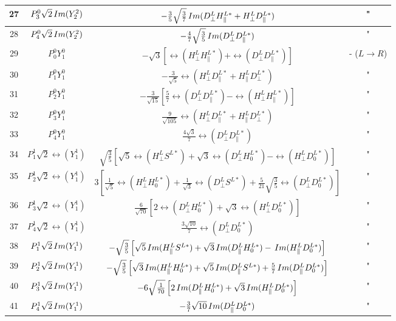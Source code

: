 \begin{tabular}{c|c|c|c}
 27  &   $P^0_3 \sqrt{2}\, Im(Y^2_2)$ &  $-\frac{3}{5} \sqrt{ \frac{3}{7}}  \, Im(D^L_\perp H^{L\ast}_\parallel + H^L_\perp D^{L\ast}_\parallel)  $  & " \\ \hline
 28  &   $P^0_4 \sqrt{2}\, Im(Y^2_2)$ &  $-\frac{4}{7} \sqrt{\frac{3}{5}}  \, Im(D^L_\perp D^{L\ast}_\parallel) $   & " \\ \hline \hline
 29  &   $P^0_0 Y^0_1$     &  $-\sqrt{3}\left[ \rel(H^L_\perp H^{L\ast}_\parallel) + \rel(D^L_\perp D^{L\ast}_\parallel) \right]$  & - ($L \to R$) \\ \hline
 30  &   $P^0_1 Y^0_1$     &  $-\frac{3}{\sqrt{5}} \rel( H^L_\perp D^{L\ast}_\parallel + H^L_\parallel D^{L\ast}_\perp ) $ & " \\ \hline
 31  &   $P^0_2 Y^0_1$     &  $-\frac{3}{\sqrt{15}} \left[ \frac{5}{7} \rel(D^L_\perp D^{L\ast}_\parallel) - \rel(H^L_\perp H^{L\ast}_\parallel)  \right]$ & " \\ \hline
 32  &   $P^0_3 Y^0_1$     &  $\frac{9}{\sqrt{105}}  \rel(H^L_\perp D^{L\ast}_\parallel  + H^L_\parallel D^{L\ast}_\perp ) $ & " \\ \hline
 33  &   $P^0_4 Y^0_1$     &  $\frac{4\sqrt{3}}{7} \rel(D^L_\perp D^{L\ast}_\parallel)$  & " \\ \hline
 34  &   $P^1_1 \sqrt{2}\rel(Y^1_1)$   & $\sqrt{\frac{3}{5}} \left[ \sqrt{5} \rel(H^L_\perp S^{L \ast})  + \sqrt{3} \rel(D^L_\perp H^{L\ast}_0)  - \rel(H^L_\perp D^{L \ast}_0) \right]$  & " \\ \hline
 35  &   $P^1_2 \sqrt{2}\rel(Y^1_1)$   & $ 3 \left[ \frac{1}{\sqrt{5}} \rel(H^L_\perp H^{L \ast}_0)  + \frac{1}{\sqrt{3}} \rel(D^L_\perp S^{L\ast})  + \frac{5}{21} \sqrt{\frac{3}{5}} \rel(D^L_\perp D^{L \ast}_0 ) \right] $  & " \\ \hline
 36  &   $P^1_3 \sqrt{2}\rel(Y^1_1)$   & $ \frac{6}{\sqrt{70}} \left[ 2 \rel(D^L_\perp H^{L \ast}_0)  + \sqrt{3} \rel(H^L_\perp D^{L\ast}_0) \right]$  & " \\ \hline
 37  &   $P^1_4 \sqrt{2}\rel(Y^1_1)$   & $\frac{3 \sqrt{10}}{7} \rel(D^L_\perp D^{L \ast}_0 ) $  & " \\ \hline
 38  &   $P^1_1 \sqrt{2}\, Im(Y^1_1)$   & $-\sqrt{\frac{3}{5}} \left[ \sqrt{5} \, Im ( H^L_\parallel S^{L\ast}) + \sqrt{3} \, Im(D^L_\parallel H^{L \ast}_0) - \, Im(H^L_\parallel D^{L \ast}_0)  \right]  $  & " \\ \hline
 39  &   $P^1_2 \sqrt{2}\, Im(Y^1_1)$   & $ -\sqrt{\frac{3}{5}} \left[ \sqrt{3} \, Im(H^L_\parallel H^{L \ast}_0)  + \sqrt{5} \, Im(D^L_\parallel S^{L\ast})  + \frac{5}{7} \, Im(D^L_\parallel D^{L \ast}_0 )\right] $  & " \\ \hline
 40  &   $P^1_3 \sqrt{2}\, Im(Y^1_1)$   & $ -6\sqrt{\frac{1}{70}}\left[ 2\, Im(D^L_\parallel H^{L \ast}_0)  + \sqrt{3} \, Im(H^L_\parallel D^{L\ast}_0)\right]$   & " \\ \hline
 41  &   $P^1_4 \sqrt{2}\, Im(Y^1_1)$   & $-\frac{3}{7} \sqrt{10} \, Im(D^L_\parallel D^{L\ast}_0) $  & " \\ \hline
\end{tabular}
